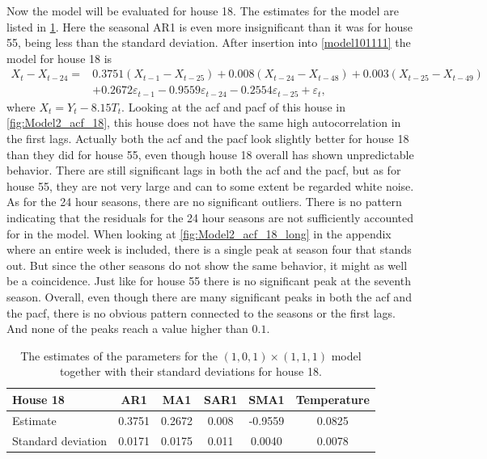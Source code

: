 \noindent Now the model will be evaluated for house 18. The estimates for the model are listed in \cref{tab:ParamSig_House18}. Here the seasonal AR1 is even more insignificant than it was for house 55, being less than the standard deviation. After insertion into \cref{model101111} the model for house 18 is
\begin{align}
    X_t-X_{t-24} = &0.3751 (X_{t-1}-X_{t-25}) + 0.008 (X_{t-24}-X_{t-48}) + 0.003 (X_{t-25}-X_{t-49}) \nonumber\\  &+ 0.2672 \varepsilon_{t-1} - 0.9559 \varepsilon_{t-24} - 0.2554 \varepsilon_{t-25} + \varepsilon_t, \label{pred_model}
\end{align}
where $X_t = Y_t - 8.15 T_t$. Looking at the acf and pacf of this house in \cref{fig:Model2_acf_18}, this house does not have the same high autocorrelation in the first lags. Actually both the acf and the pacf look slightly better for house 18 than they did for house 55, even though house 18 overall has shown unpredictable behavior. There are still significant lags in both the acf and the pacf, but as for house 55, they are not very large and can to some extent be regarded white noise. As for the 24 hour seasons, there are no significant outliers. There is no pattern indicating that the residuals for the 24 hour seasons are not sufficiently accounted for in the model. When looking at \cref{fig:Model2_acf_18_long} in the appendix where an entire week is included, there is a single peak at season four that stands out. But since the other seasons do not show the same behavior, it might as well be a coincidence. Just like for house 55 there is no significant peak at the seventh season. Overall, even though there are many significant peaks in both the acf and the pacf, there is no obvious pattern connected to the seasons or the first lags. And none of the peaks reach a value higher than $0.1$.

 \begin{table}[]
    \centering
    \begin{tabular}{l|ccccc}
    \hline
    \textbf{House 18} & \textbf{AR1} & \textbf{MA1} & \textbf{SAR1} & \textbf{SMA1} & \textbf{Temperature} \\ \hline \hline
    Estimate           & 0.3751 & 0.2672 & 0.008 & -0.9559 & 0.0825      \\
    Standard deviation & 0.0171 & 0.0175 & 0.011 & 0.0040  & 0.0078      \\ \hline
    \end{tabular}
    \caption{The estimates of the parameters for the $(1,0,1)\times (1,1,1)$ model together with their standard deviations for house 18.}
    \label{tab:ParamSig_House18}
    \end{table}


